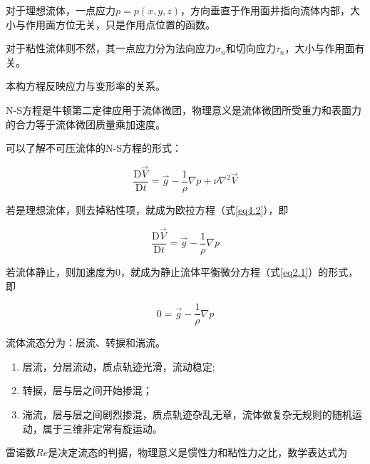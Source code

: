 

对于理想流体，一点应力$p = p(x, y, z)$，方向垂直于作用面并指向流体内部，大小与作用面方位无关，只是作用点位置的函数。

对于粘性流体则不然，其一点应力分为法向应力$\sigma_n$和切向应力$\tau_n$，大小与作用面有关。



本构方程反映应力与变形率的关系。


N-S方程是牛顿第二定律应用于流体微团，物理意义是流体微团所受重力和表面力的合力等于流体微团质量乘加速度。

可以了解不可压流体的N-S方程的形式：

\begin{equation}
	\dfrac{\mathrm{D} \vec{V}}{\mathrm{D} t} = \vec{g} - \dfrac{1}{\rho} \nabla p + \nu \nabla^2 \vec{V}
\end{equation}

若是理想流体，则去掉粘性项，就成为欧拉方程（式\ref{eq4.2}），即

\begin{equation*}
	\dfrac{\mathrm{D} \vec{V}}{\mathrm{D} t} = \vec{g} - \dfrac{1}{\rho} \nabla p
\end{equation*}

若流体静止，则加速度为0，就成为静止流体平衡微分方程（式\ref{eq2.1}）的形式，即

\begin{equation*}
	0 = \vec{g} - \dfrac{1}{\rho} \nabla p
\end{equation*}



流体流态分为：层流、转捩和湍流。

\begin{enumerate}
	\item 层流，分层流动，质点轨迹光滑，流动稳定;
	\item 转捩，层与层之间开始掺混；
	\item 湍流，层与层之间剧烈掺混，质点轨迹杂乱无章，流体做复杂无规则的随机运动，属于三维非定常有旋运动。
\end{enumerate}


雷诺数$Re$是决定流态的判据，物理意义是惯性力和粘性力之比，数学表达式为

